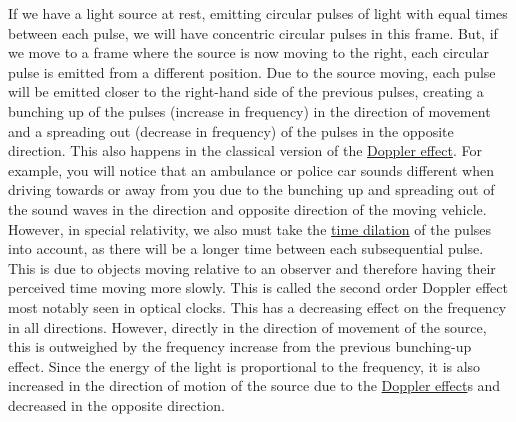 If we have a light source at rest, emitting circular pulses of light with equal times between each pulse, we will have concentric circular pulses in this frame.
But, if we move to a frame where the source is now moving to the right, each circular pulse is emitted from a different position.
Due to the source moving, each pulse will be emitted closer to the right-hand side of the previous pulses, creating a bunching up of the pulses (increase in frequency) in the direction of movement and a spreading out (decrease in frequency) of the pulses in the opposite direction.
This also happens in the classical version of the \hyperlink{def-doppler-effect}{Doppler effect}.
For example, you will notice that an ambulance or police car sounds different when driving towards or away from you due to the bunching up and spreading out of the sound waves in the direction and opposite direction of the moving vehicle.
However, in special relativity, we also must take the \hyperlink{def-time-dilation}{time dilation} of the pulses into account, as there will be a longer time between each subsequential pulse.
This is due to objects moving relative to an observer and therefore having their perceived time moving more slowly.
This is called the second order Doppler effect most notably seen in optical clocks.
This has a decreasing effect on the frequency in all directions.
However, directly in the direction of movement of the source, this is outweighed by the frequency increase from the previous bunching-up effect.
Since the energy of the light is proportional to the frequency, it is also increased in the direction of motion of the source due to the \hyperlink{def-doppler-effect}{Doppler effect}s and decreased in the opposite direction.

